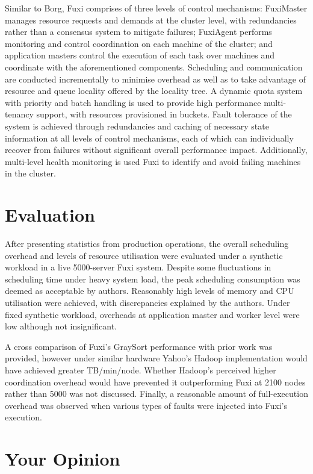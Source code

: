\documentclass[11pt]{article}
\begin{document}
Similar to Borg, Fuxi comprises of three levels of control mechanisms: FuxiMaster manages resource requests and demands at the cluster level, with redundancies rather than a consensus system to mitigate failures; FuxiAgent performs monitoring and control coordination on each machine of the cluster; and application masters control the execution of each task over machines and coordinate with the aforementioned components. Scheduling and communication are conducted incrementally to minimise overhead as well as to take advantage of resource and queue locality offered by the locality tree. A dynamic quota system with priority and batch handling is used to provide high performance multi-tenancy support, with resources provisioned in buckets. Fault tolerance of the system is achieved through redundancies and caching of necessary state information at all levels of control mechanisms, each of which can individually recover from failures without significant overall performance impact. Additionally, multi-level health monitoring is used Fuxi to identify and avoid failing machines in the cluster.

\section*{Evaluation}

After presenting statistics from production operations, the overall scheduling overhead and levels of resource utilisation were evaluated under a synthetic workload in a live 5000-server Fuxi system. Despite some fluctuations in scheduling time under heavy system load, the peak scheduling consumption was deemed as acceptable by authors. Reasonably high levels of memory and CPU utilisation were achieved, with discrepancies explained by the authors. Under fixed synthetic workload, overheads at application master and worker level were low although not insignificant. 

A cross comparison of Fuxi's GraySort performance with prior work was provided, however under similar hardware Yahoo's Hadoop implementation would have achieved greater TB/min/node. Whether Hadoop's perceived higher coordination overhead would have prevented it outperforming Fuxi at 2100 nodes rather than 5000 was not discussed. Finally, a reasonable amount of full-execution overhead was observed when various types of faults were injected into Fuxi's execution. 

\section*{Your Opinion}
\end{document}

